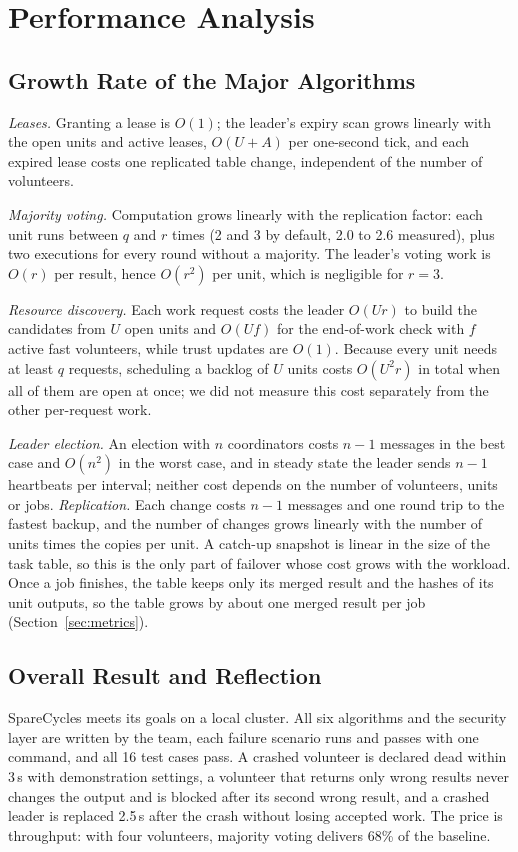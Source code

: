 \section{Performance Analysis}
\label{sec:performance}

\subsection{Growth Rate of the Major Algorithms}
\emph{Leases.} Granting a lease is $O(1)$; the leader's expiry scan grows linearly with the open units and active leases, $O(U + A)$ per one-second tick, and each expired lease costs one replicated table change, independent of the number of volunteers.

\emph{Majority voting.} Computation grows linearly with the replication factor: each unit runs between $q$ and $r$ times (2 and 3 by default, 2.0 to 2.6 measured), plus two executions for every round without a majority. The leader's voting work is $O(r)$ per result, hence $O(r^2)$ per unit, which is negligible for $r = 3$.

\emph{Resource discovery.} Each work request costs the leader $O(Ur)$ to build the candidates from $U$ open units and $O(Uf)$ for the end-of-work check with $f$ active fast volunteers, while trust updates are $O(1)$. Because every unit needs at least $q$ requests, scheduling a backlog of $U$ units costs $O(U^2 r)$ in total when all of them are open at once; we did not measure this cost separately from the other per-request work.

\emph{Leader election.} An election with $n$ coordinators costs $n-1$ messages in the best case and $O(n^2)$ in the worst case, and in steady state the leader sends $n-1$ heartbeats per interval; neither cost depends on the number of volunteers, units or jobs. \emph{Replication.} Each change costs $n-1$ messages and one round trip to the fastest backup, and the number of changes grows linearly with the number of units times the copies per unit. A catch-up snapshot is linear in the size of the task table, so this is the only part of failover whose cost grows with the workload. Once a job finishes, the table keeps only its merged result and the hashes of its unit outputs, so the table grows by about one merged result per job (Section~\ref{sec:metrics}).

\subsection{Overall Result and Reflection}
SpareCycles meets its goals on a local cluster. All six algorithms and the security layer are written by the team, each failure scenario runs and passes with one command, and all 16 test cases pass. A crashed volunteer is declared dead within 3\,s with demonstration settings, a volunteer that returns only wrong results never changes the output and is blocked after its second wrong result, and a crashed leader is replaced 2.5\,s after the crash without losing accepted work. The price is throughput: with four volunteers, majority voting delivers 68\% of the baseline.

